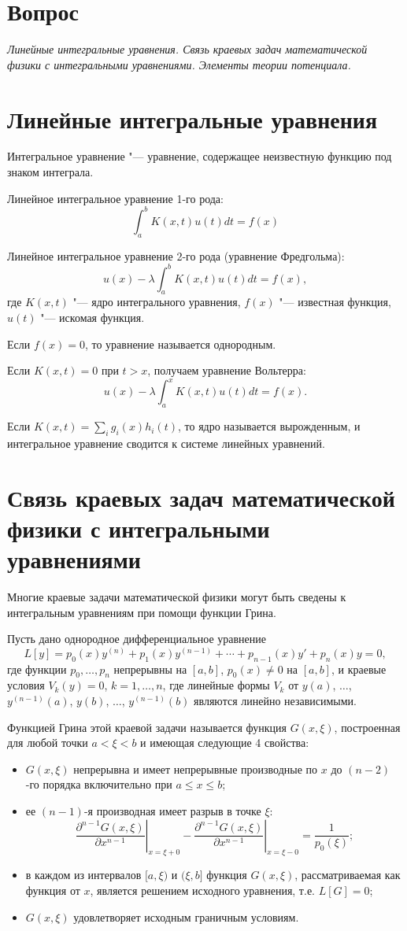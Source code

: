 \documentclass[a4paper,12pt]{article}
\begin{document}
\section*{Вопрос }
{\em Линейные интегральные уравнения. Связь краевых задач
математической физики с интегральными уравнениями.
Элементы теории потенциала.}


\section{Линейные интегральные уравнения}

Интегральное уравнение "--- уравнение, содержащее неизвестную функцию
под знаком интеграла.

Линейное интегральное уравнение 1-го рода:
$$\int_a^b K(x,t)u(t)dt=f(x)$$

Линейное интегральное уравнение 2-го рода (уравнение Фредгольма):
$$u(x)-\lambda\int_a^b K(x,t)u(t)dt=f(x),$$
где $K(x,t)$ "--- ядро интегрального уравнения, $f(x)$ "---
известная функция, $u(t)$ "--- искомая функция.

Если $f(x)=0$, то уравнение называется однородным.

Если $K(x,t)=0$ при $t>x$, получаем уравнение Вольтерра:
$$u(x)-\lambda\int_a^x K(x,t)u(t)dt=f(x).$$

Если $K(x,t)=\sum_i g_i(x)h_i(t)$, то ядро называется вырожденным,
и интегральное уравнение сводится к системе линейных уравнений.


\section{Связь краевых задач математической физики
с интегральными уравнениями}

Многие краевые задачи математической физики могут быть сведены
к интегральным уравнениям при помощи функции Грина.

Пусть дано однородное дифференциальное уравнение
$$L[y]=p_0(x)y^{(n)}+p_1(x)y^{(n-1)}+\cdots+p_{n-1}(x)y'+p_n(x)y=0,$$
где функции $p_0,\dots,p_n$ непрерывны на $[a,b]$, $p_0(x)\ne0$ на
$[a,b]$, и краевые условия $V_k(y)=0$, $k=1,\dots,n$, где линейные
формы $V_k$ от $y(a)$, $\dots$, $y^{(n-1)}(a)$, $y(b)$, $\dots$,
$y^{(n-1)}(b)$ являются линейно независимыми.

Функцией Грина этой краевой задачи называется функция $G(x,\xi)$,
построенная для любой точки $a<\xi<b$ и имеющая следующие 4 свойства:
\begin{itemize}
\item $G(x,\xi)$ непрерывна и имеет непрерывные производные по $x$
до $(n-2)$-го порядка включительно при $a\le x\le b$;
\item ее $(n-1)$-я производная имеет разрыв в точке $\xi$:
$$\left.\frac{\partial^{n-1}G(x,\xi)}{\partial x^{n-1}}\right|_{x=\xi+0}
    -\left.\frac{\partial^{n-1}G(x,\xi)}{\partial x^{n-1}}\right|_{x=\xi-0}
    =\frac{1}{p_0(\xi)};$$
\item в каждом из интервалов $[a,\xi)$ и $(\xi,b]$ функция $G(x,\xi)$,
рассматриваемая как функция от $x$, является решением исходного уравнения,
т.е. $L[G]=0$;
\item $G(x,\xi)$ удовлетворяет исходным граничным условиям.
\end{itemize}
\end{document}
